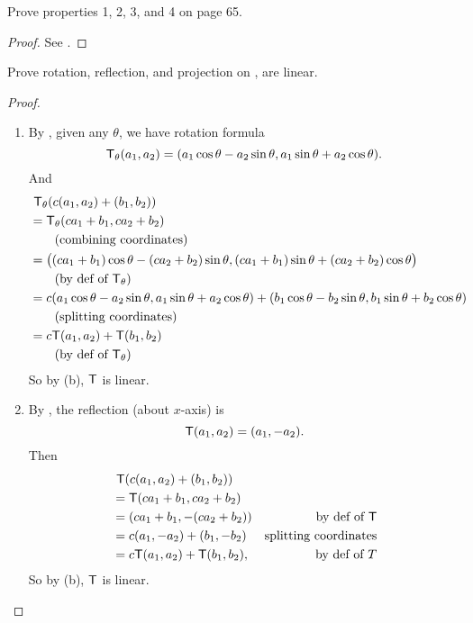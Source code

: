 \begin{exercise} \label{exercise 2.1.7}
Prove properties 1, 2, 3, and 4 on page 65.
\end{exercise}

\begin{proof}
See .
\end{proof}

\begin{exercise} \label{exercise 2.1.8}
Prove rotation, reflection, and projection on ,  are linear.
\end{exercise}

\begin{proof} \ 

\begin{enumerate}
\item
By , given any \(\theta\), we have rotation formula
\[
    \textsf{T}_{\theta}(a_1, a_2) = (a_1 \cos \theta - a_2 \sin \theta, a_1 \sin \theta + a_2 \cos \theta).
\]
And
\begin{align*}
    & \ \textsf{T}_{\theta}(c(a_1, a_2) + (b_1, b_2)) \\
    & = \textsf{T}_{\theta}(ca_1 + b_1, ca_2 + b_2) \\
    & \text{\ \ \ \ \ \ (combining coordinates)} \\
    & = \big( (ca_1 + b_1) \cos \theta - (ca_2 + b_2) \sin \theta, (ca_1 + b_1) \sin \theta + (ca_2 + b_2) \cos \theta \big) \\
    & \text{\ \ \ \ \ \ (by def of \(\textsf{T}_{\theta}\))} \\
    & = c(a_1 \cos \theta - a_2 \sin \theta, a_1 \sin \theta + a_2 \cos \theta) + (b_1 \cos \theta - b_2 \sin \theta, b_1 \sin \theta + b_2 \cos \theta) \\
    & \text{\ \ \ \ \ \ (splitting coordinates)} \\
    & = c\textsf{T}(a_1, a_2) + \textsf{T}(b_1, b_2) \\
    & \text{\ \ \ \ \ \ (by def of \(\textsf{T}_{\theta}\))}
\end{align*}
So by (b), \(\textsf{T}\) is linear.


\item
By , the reflection (about \(x\)-axis) is
\[
    \textsf{T}(a_1, a_2) = (a_1, -a_2).
\]
Then
\begin{align*}
    & \ \textsf{T}(c(a_1, a_2) + (b_1, b_2)) \\
    & = \textsf{T}(ca_1 + b_1, ca_2 + b_2) \\
    & = (ca_1 + b_1, -(ca_2 + b_2)) & \text{by def of \(\textsf{T}\)} \\
    & = c(a_1, -a_2) + (b_1, -b_2) & \text{splitting coordinates} \\
    & = c\textsf{T}(a_1, a_2) + \textsf{T}(b_1, b_2), & \text{by def of \(T\)}
\end{align*}
So by (b), \(\textsf{T}\) is linear.


\end{enumerate}
\end{proof}

